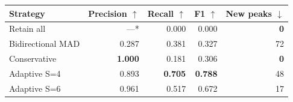 \begingroup
{}
\begin{tabular}{lrrrr}
\toprule
Strategy & Precision $\uparrow$ & Recall $\uparrow$ & F1 $\uparrow$ & New peaks $\downarrow$ \\
\midrule
Retain all & ---* & 0.000 & 0.000 & \textbf{0} \\
Bidirectional MAD & 0.287 & 0.381 & 0.327 & 72 \\
Conservative & \textbf{1.000} & 0.181 & 0.306 & \textbf{0} \\
Adaptive S=4 & 0.893 & \textbf{0.705} & \textbf{0.788} & 48 \\
Adaptive S=6 & 0.961 & 0.517 & 0.672 & 17 \\
\bottomrule
\end{tabular}
\endgroup
